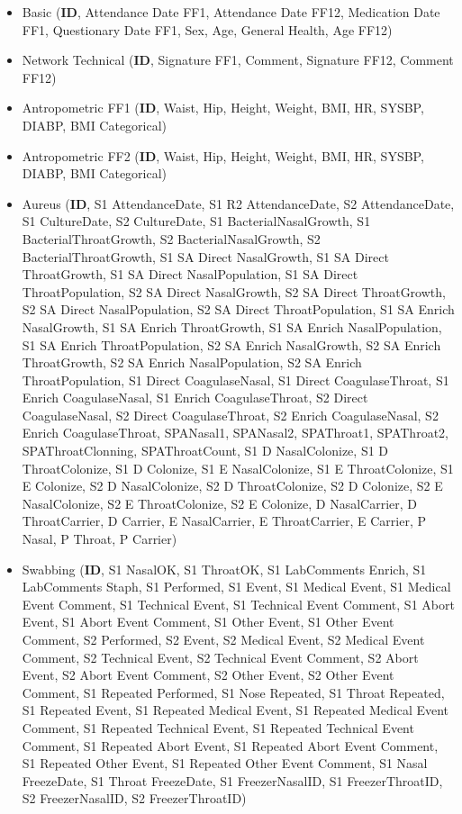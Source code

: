 \begin{sloppypar}
\begin{itemize}
    \item {Basic} (\textbf{ID}, Attendance Date FF1, Attendance Date FF12, Medication Date FF1, Questionary Date FF1, Sex, Age, General Health, Age FF12)

    \item {Network Technical} (\textbf{ID}, Signature FF1, Comment, Signature FF12, Comment FF12)
    
    \item {Antropometric FF1} (\textbf{ID}, Waist, Hip, Height, Weight, BMI, HR, SYSBP, DIABP, BMI Categorical)
    
    \item {Antropometric FF2} (\textbf{ID}, Waist, Hip, Height, Weight, BMI, HR, SYSBP, DIABP, BMI Categorical)

    \item {Aureus} (\textbf{ID}, S1 AttendanceDate, S1 R2 AttendanceDate, S2 AttendanceDate, S1 CultureDate, S2 CultureDate, S1 BacterialNasalGrowth, S1 BacterialThroatGrowth, S2 BacterialNasalGrowth, S2 BacterialThroatGrowth, S1 SA Direct NasalGrowth, S1 SA Direct ThroatGrowth, S1 SA Direct NasalPopulation, S1 SA Direct ThroatPopulation, S2 SA Direct NasalGrowth, S2 SA Direct ThroatGrowth, S2 SA Direct NasalPopulation, S2 SA Direct ThroatPopulation, S1 SA Enrich NasalGrowth, S1 SA Enrich ThroatGrowth, S1 SA Enrich NasalPopulation, S1 SA Enrich ThroatPopulation, S2 SA Enrich NasalGrowth, S2 SA Enrich ThroatGrowth, S2 SA Enrich NasalPopulation, S2 SA Enrich ThroatPopulation, S1 Direct CoagulaseNasal, S1 Direct CoagulaseThroat, S1 Enrich CoagulaseNasal, S1 Enrich CoagulaseThroat, S2 Direct CoagulaseNasal, S2 Direct CoagulaseThroat, S2 Enrich CoagulaseNasal, S2 Enrich CoagulaseThroat, SPANasal1, SPANasal2, SPAThroat1, SPAThroat2, SPAThroatClonning, SPAThroatCount, S1 D NasalColonize, S1 D ThroatColonize, S1 D Colonize, S1 E NasalColonize, S1 E ThroatColonize, S1 E Colonize, S2 D NasalColonize, S2 D ThroatColonize, S2 D Colonize, S2 E NasalColonize, S2 E ThroatColonize, S2 E Colonize, D NasalCarrier, D ThroatCarrier, D Carrier, E NasalCarrier, E ThroatCarrier, E Carrier, P Nasal, P Throat, P Carrier)

    \item {Swabbing} (\textbf{ID}, S1 NasalOK, S1 ThroatOK, S1 LabComments Enrich, S1 LabComments Staph, S1 Performed, S1 Event, S1 Medical Event, S1 Medical Event Comment, S1 Technical Event, S1 Technical Event Comment, S1 Abort Event, S1 Abort Event Comment, S1 Other Event, S1 Other Event Comment, S2 Performed, S2 Event, S2 Medical Event, S2 Medical Event Comment, S2 Technical Event, S2 Technical Event Comment, S2 Abort Event, S2 Abort Event Comment, S2 Other Event, S2 Other Event Comment, S1 Repeated Performed, S1 Nose Repeated, S1 Throat Repeated, S1 Repeated Event, S1 Repeated Medical Event, S1 Repeated Medical Event Comment, S1 Repeated Technical Event, S1 Repeated Technical Event Comment, S1 Repeated Abort Event, S1 Repeated Abort Event Comment, S1 Repeated Other Event, S1 Repeated Other Event Comment, S1 Nasal FreezeDate, S1 Throat FreezeDate, S1 FreezerNasalID, S1 FreezerThroatID, S2 FreezerNasalID, S2 FreezerThroatID)


\end{itemize}
\end{sloppypar}

